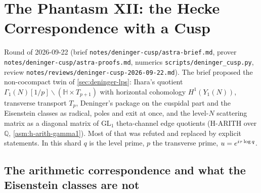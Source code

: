 \section{The Phantasm XII: the Hecke Correspondence with a Cusp}
\label{sec:deninger-cusp}

Round of 2026-09-22 (brief \texttt{notes/deninger-cusp/astra-brief.md}, prover \texttt{notes/deninger-cusp/astra-proofs.md},
numerics \texttt{scripts/deninger\_cusp.py}, review \texttt{notes/reviews/deninger-cusp-2026-09-22.md}). The brief proposed
the non-cocompact twin of \cref{sec:deninger-lps}: Ihara's quotient $\Gamma_1(N)[1/p]\backslash(\mathbb H\times T_{p+1})$ with
horizontal cohomology $H^1(Y_1(N))$, transverse transport $T_p$, Deninger's package on the cuspidal part and the
Eisenstein classes as radical, poles and exit at once, and the level-$N$ scattering matrix as a diagonal matrix of GL$_1$
theta-channel edge quotients (H-ARITH over $\mathbb Q$, \cref{asm:h-arith-gamma1}). Most of that was refuted and replaced
by explicit statements. In this shard $q$ is the level prime, $p$ the transverse prime, $u = e^{i\tau\log q}$.

\subsection{The arithmetic correspondence and what the Eisenstein classes are not}

